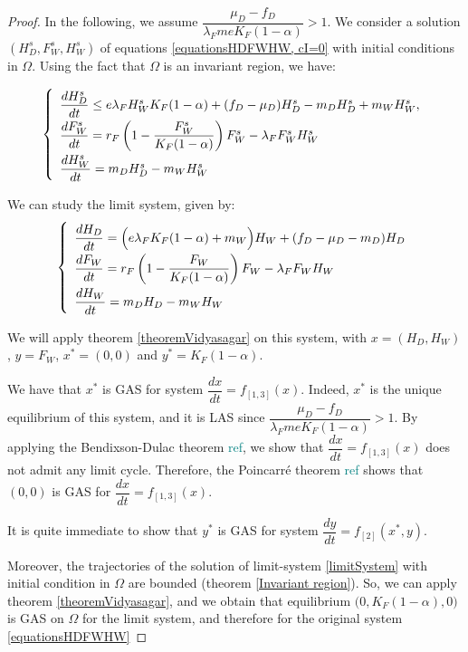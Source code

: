 \documentclass{article}
\newcommand{\lfw}{\lambda_{F}}
\newcommand{\lfw}{\lambda_{F}}
\newcommand{\marc}[1]{\textcolor{teal}{#1}}
\begin{document}
\begin{proof}
In the following, we assume $\dfrac{\mu_D - f_D}{\lfw m e K_F(1-\alpha)} >1$. We consider a solution $(H_D^s, F_W^s, H_W^s)$ of equations \eqref{equationsHDFWHW, cI=0} with initial conditions in $\Omega$. Using the fact that $\Omega$ is an invariant region, we have:

\begin{equation}
\def\arraystretch{2}
\left\{ \begin{array}{l}
\dfrac{dH^s_D}{dt} \leq e\lfw H^s_W K_F(1-\alpha) + (f_D - \mu_D) H^s_D - m_D H^s_D + m_W H^s_W , \\
\dfrac{dF^s_W}{dt} = r_F \left(1 - \dfrac{F^s_W}{K_F(1-\alpha)} \right) F^s_W - \lfw F^s_W H^s_W \\
\dfrac{dH^s_W}{dt}= m_D H^s_D - m_W H^s_W 
\end{array} \right.
\end{equation}

We can study the limit system, given by:
\begin{equation}
\def\arraystretch{2}
\left\{ \begin{array}{l}
\dfrac{dH_D}{dt} = \Big(e\lfw K_F(1-\alpha) + m_W\Big)H_W + (f_D - \mu_D - m_D) H_D \\
\dfrac{dF_W}{dt} = r_F \left(1 - \dfrac{F_W}{K_F(1-\alpha)} \right) F_W - \lfw F_W H_W \\
\dfrac{dH_W}{dt}= m_D H_D - m_W H_W 
\end{array} \right.
\label{limitSystem}
\end{equation}

We will apply theorem \ref{theoremVidyasagar} on this system, with $x = (H_D, H_W)$, $y = F_W$, $x^* = (0,0)$ and $y^* = K_F(1- \alpha)$.

We have that $x^*$ is GAS for system $\dfrac{dx}{dt} = f_{[1,3]}(x)$. Indeed, $x^*$ is the unique equilibrium of this system, and it is LAS since $\dfrac{\mu_D - f_D}{\lfw m e K_F(1-\alpha)} >1$. By applying the Bendixson-Dulac theorem \marc{ref}, we show that $\dfrac{dx}{dt} = f_{[1,3]}(x)$ does not admit any limit cycle. Therefore, the Poincarré theorem \marc{ref} shows that $(0, 0)$ is GAS for $\dfrac{dx}{dt} = f_{[1,3]}(x)$.

It is quite immediate to show that $y^*$ is GAS for system $\dfrac{dy}{dt} = f_{[2]}(x^*, y)$. 

Moreover, the trajectories of the solution of limit-system \eqref{limitSystem} with initial condition in $\Omega$ are bounded (theorem \ref{Invariant region}). So, we can apply theorem \ref{theoremVidyasagar}, and we obtain that equilibrium $\Big(0, K_F(1-\alpha), 0 \Big)$ is GAS on $\Omega$ for the limit system, and therefore for the original system \eqref{equationsHDFWHW}
\end{proof}
\end{document}

